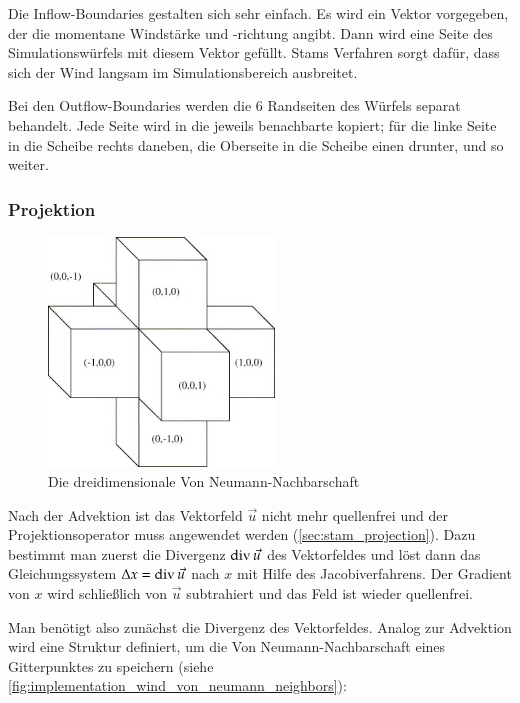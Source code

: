 Die Inflow-Boundaries gestalten sich sehr einfach. Es wird ein Vektor
vorgegeben, der die momentane Windstärke und -richtung angibt. Dann
wird eine Seite des Simulationswürfels mit diesem Vektor
gefüllt. Stams Verfahren sorgt dafür, dass sich der Wind langsam im
Simulationsbereich ausbreitet.

Bei den Outflow-Boundaries werden die 6 Randseiten des Würfels separat
behandelt. Jede Seite wird in die jeweils benachbarte
 kopiert; für die linke Seite in die Scheibe
rechts daneben, die Oberseite in die Scheibe einen drunter, und so
weiter.

\subsubsection{Projektion}
\label{sec:implementation_wind_projection}

\begin{figure}[ht]
\centering
\includegraphics[width=6cm]{images/von_neumann}
\caption{Die dreidimensionale Von Neumann-Nachbarschaft}
\label{fig:implementation_wind_von_neumann_neighbors}
\end{figure}

Nach der Advektion ist das Vektorfeld $\vec{u}$ nicht mehr quellenfrei
und der Projektionsoperator muss angewendet werden
(\Pimiddyvgl \autoref{sec:stam_projection}). Dazu bestimmt man zuerst die
Divergenz $\operatorname*{div} \vec{u}$ des Vektorfeldes und löst dann das
Gleichungssystem $\Delta x = \operatorname*{div} \vec{u}$ nach $x$
mit Hilfe des Jacobiverfahrens. Der Gradient von $x$ wird schließlich
von $\vec{u}$ subtrahiert und das Feld ist wieder quellenfrei.

Man benötigt also zunächst die Divergenz des Vektorfeldes. Analog zur
Advektion wird eine Struktur definiert, um die Von
Neumann-Nachbarschaft eines Gitterpunktes zu speichern (siehe
\autoref{fig:implementation_wind_von_neumann_neighbors}):

